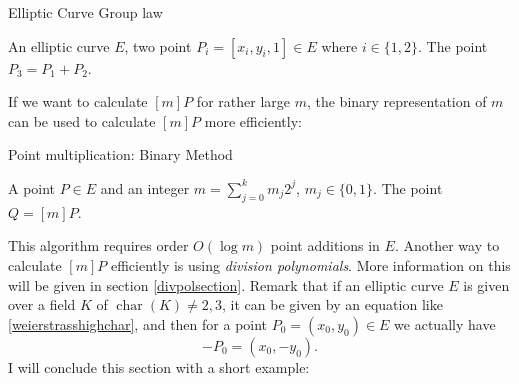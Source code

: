\documentclass{article}
\numberwithin{equation}{section}
\theoremstyle{definition}
\newcommand{\Char}[1]{\operatorname{char} (#1)} %
\begin{document}
\begin{algorithm}\label{grplawalg}
\caption{Elliptic Curve Group law}
\begin{algorithmic}[1]
  \normalsize
  \REQUIRE An elliptic curve $E$, two point $P_i=[x_i,y_i,1]\in E$ where $i \in \{1,2\}$.
  \ENSURE The point $P_3=P_1+P_2$.
  \ELSE
  \ELSE
  \ENDIF
  \ENDIF 
\end{algorithmic}
\end{algorithm}

If we want to calculate $[m]P$ for rather large $m$, the binary representation of $m$ can be used to calculate $[m]P$ more efficiently:

\begin{algorithm}\label{binaryptmult}
\caption{Point multiplication: Binary Method}
\begin{algorithmic}[1]
  \normalsize
  \REQUIRE A point $P \in E$ and an integer $m=\sum_{j=0}^k m_j2^j$, $m_j \in \{0,1\}$.
  \ENSURE The point $Q=[m]P$.
  \ENDIF
  \ENDFOR
\end{algorithmic}
\end{algorithm}

This algorithm requires order $O(\log m)$ point additions in $E$. Another way to calculate $[m]P$ efficiently is using \emph{division polynomials}. More information on this will be given in section \ref{divpolsection}.
Remark that if an elliptic curve $E$ is given over a field $K$ of $\Char{K} \neq 2,3$, it can be given by an  equation like \ref{weierstrasshighchar}, and then for a point $P_0=(x_0,y_0) \in E$ we actually have \begin{equation}\label{minushighchar}-P_0=(x_0,-y_0).\end{equation} I will conclude this section with a short example:
\end{document}

